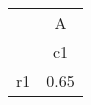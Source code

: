 \begin{tabular}{l*{1}{c}}
\hline\hline
            &           A\\
            &          c1\\
\hline
r1          &        0.65\\
\hline\hline
\end{tabular}
